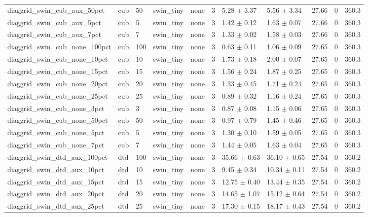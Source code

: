 \begin{tabular}{lllllllllll}
diaggrid_swin_cub_aux_50pct & cub & 50 & swin_tiny & none & 3 & 5.28 $\pm$ 3.37 & 5.56 $\pm$ 3.34 & 27.66 & 0 & 360.3 \\
diaggrid_swin_cub_aux_5pct & cub & 5 & swin_tiny & none & 3 & 1.42 $\pm$ 0.12 & 1.63 $\pm$ 0.07 & 27.66 & 0 & 360.3 \\
diaggrid_swin_cub_aux_7pct & cub & 7 & swin_tiny & none & 3 & 1.33 $\pm$ 0.02 & 1.58 $\pm$ 0.03 & 27.66 & 0 & 360.3 \\
diaggrid_swin_cub_none_100pct & cub & 100 & swin_tiny & none & 3 & 0.63 $\pm$ 0.11 & 1.06 $\pm$ 0.09 & 27.65 & 0 & 360.3 \\
diaggrid_swin_cub_none_10pct & cub & 10 & swin_tiny & none & 3 & 1.73 $\pm$ 0.18 & 2.00 $\pm$ 0.07 & 27.65 & 0 & 360.3 \\
diaggrid_swin_cub_none_15pct & cub & 15 & swin_tiny & none & 3 & 1.56 $\pm$ 0.24 & 1.87 $\pm$ 0.25 & 27.65 & 0 & 360.3 \\
diaggrid_swin_cub_none_20pct & cub & 20 & swin_tiny & none & 3 & 1.33 $\pm$ 0.45 & 1.71 $\pm$ 0.24 & 27.65 & 0 & 360.3 \\
diaggrid_swin_cub_none_25pct & cub & 25 & swin_tiny & none & 3 & 0.89 $\pm$ 0.32 & 1.16 $\pm$ 0.24 & 27.65 & 0 & 360.3 \\
diaggrid_swin_cub_none_3pct & cub & 3 & swin_tiny & none & 3 & 0.87 $\pm$ 0.08 & 1.15 $\pm$ 0.06 & 27.65 & 0 & 360.3 \\
diaggrid_swin_cub_none_50pct & cub & 50 & swin_tiny & none & 3 & 0.97 $\pm$ 0.79 & 1.45 $\pm$ 0.46 & 27.65 & 0 & 360.3 \\
diaggrid_swin_cub_none_5pct & cub & 5 & swin_tiny & none & 3 & 1.30 $\pm$ 0.10 & 1.59 $\pm$ 0.05 & 27.65 & 0 & 360.3 \\
diaggrid_swin_cub_none_7pct & cub & 7 & swin_tiny & none & 3 & 1.44 $\pm$ 0.05 & 1.63 $\pm$ 0.04 & 27.65 & 0 & 360.3 \\
diaggrid_swin_dtd_aux_100pct & dtd & 100 & swin_tiny & none & 3 & 35.66 $\pm$ 0.63 & 36.10 $\pm$ 0.65 & 27.54 & 0 & 360.2 \\
diaggrid_swin_dtd_aux_10pct & dtd & 10 & swin_tiny & none & 3 & 9.45 $\pm$ 0.34 & 10.34 $\pm$ 0.11 & 27.54 & 0 & 360.2 \\
diaggrid_swin_dtd_aux_15pct & dtd & 15 & swin_tiny & none & 3 & 12.75 $\pm$ 0.40 & 13.44 $\pm$ 0.35 & 27.54 & 0 & 360.2 \\
diaggrid_swin_dtd_aux_20pct & dtd & 20 & swin_tiny & none & 3 & 14.65 $\pm$ 1.07 & 15.12 $\pm$ 0.64 & 27.54 & 0 & 360.2 \\
diaggrid_swin_dtd_aux_25pct & dtd & 25 & swin_tiny & none & 3 & 17.30 $\pm$ 0.15 & 18.17 $\pm$ 0.43 & 27.54 & 0 & 360.2 \\

\end{tabular}
